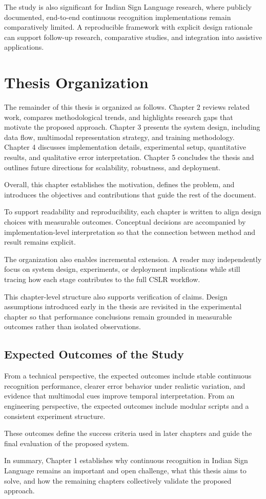The study is also significant for Indian Sign Language research, where publicly documented, end-to-end continuous recognition implementations remain comparatively limited. A reproducible framework with explicit design rationale can support follow-up research, comparative studies, and integration into assistive applications.

\section{Thesis Organization}

The remainder of this thesis is organized as follows. Chapter 2 reviews related work, compares methodological trends, and highlights research gaps that motivate the proposed approach. Chapter 3 presents the system design, including data flow, multimodal representation strategy, and training methodology. Chapter 4 discusses implementation details, experimental setup, quantitative results, and qualitative error interpretation. Chapter 5 concludes the thesis and outlines future directions for scalability, robustness, and deployment.

Overall, this chapter establishes the motivation, defines the problem, and introduces the objectives and contributions that guide the rest of the document.

To support readability and reproducibility, each chapter is written to align design choices with measurable outcomes. Conceptual decisions are accompanied by implementation-level interpretation so that the connection between method and result remains explicit.

The organization also enables incremental extension. A reader may independently focus on system design, experiments, or deployment implications while still tracing how each stage contributes to the full CSLR workflow.

This chapter-level structure also supports verification of claims. Design assumptions introduced early in the thesis are revisited in the experimental chapter so that performance conclusions remain grounded in measurable outcomes rather than isolated observations.

\subsection{Expected Outcomes of the Study}

From a technical perspective, the expected outcomes include stable continuous recognition performance, clearer error behavior under realistic variation, and evidence that multimodal cues improve temporal interpretation. From an engineering perspective, the expected outcomes include modular scripts and a consistent experiment structure.

These outcomes define the success criteria used in later chapters and guide the final evaluation of the proposed system.

In summary, Chapter 1 establishes why continuous recognition in Indian Sign Language remains an important and open challenge, what this thesis aims to solve, and how the remaining chapters collectively validate the proposed approach.
